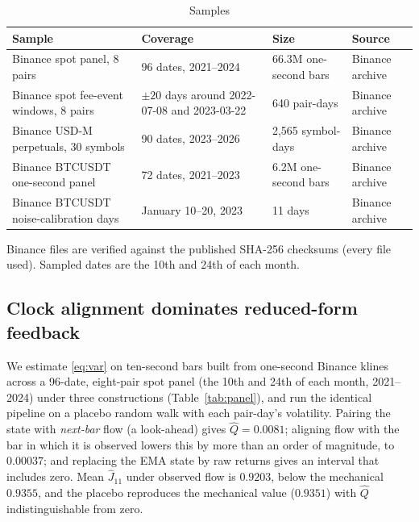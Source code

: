 \documentclass[12pt]{article}
\theoremstyle{definition}
\theoremstyle{remark}
\begin{document}
\begin{table}[t]\centering\small
\begin{threeparttable}
\caption{Samples}\label{tab:samples}
\begin{tabular}{p{}p{}p{}l}
\toprule
Sample & Coverage & Size & Source\\
\midrule
Binance spot panel, 8 pairs & 96 dates, 2021--2024 & 66.3M one-second bars & Binance archive\\
Binance spot fee-event windows, 8 pairs & $\pm20$ days around 2022-07-08 and 2023-03-22 & 640 pair-days & Binance archive\\
Binance USD-M perpetuals, 30 symbols & 90 dates, 2023--2026 & 2{,}565 symbol-days & Binance archive\\
Binance BTCUSDT one-second panel & 72 dates, 2021--2023 & 6.2M one-second bars & Binance archive\\
Binance BTCUSDT noise-calibration days & January 10--20, 2023 & 11 days & Binance archive\\
\bottomrule
\end{tabular}
\begin{tablenotes}\footnotesize\item Binance files are verified against the published SHA-256 checksums (every file used). Sampled dates are the 10th and 24th of each month.\end{tablenotes}
\end{threeparttable}
\end{table}

\subsection{Clock alignment dominates reduced-form feedback}

We estimate \eqref{eq:var} on ten-second bars built from one-second Binance klines across a 96-date, eight-pair spot panel (the 10th and 24th of each month, 2021--2024) under three constructions (Table~\ref{tab:panel}), and run the identical pipeline on a placebo random walk with each pair-day's volatility. Pairing the state with \emph{next-bar} flow (a look-ahead) gives $\hat Q=0.0081$; aligning flow with the bar in which it is observed lowers this by more than an order of magnitude, to $0.00037$; and replacing the EMA state by raw returns gives an interval that includes zero. Mean $\hat J_{11}$ under observed flow is $0.9203$, below the mechanical $0.9355$, and the placebo reproduces the mechanical value ($0.9351$) with $\hat Q$ indistinguishable from zero. 
\end{document}
